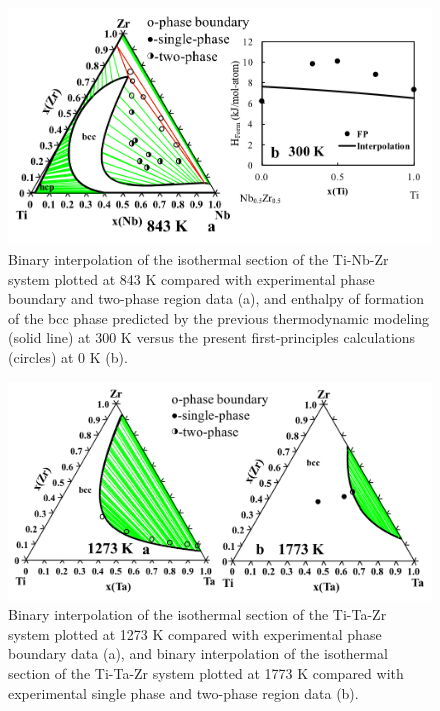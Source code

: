 \newpage
\begin{figure}[H]
	\centering
	\includegraphics[width=\textwidth]{Chapter-3/Figures/TiNbZr.png}
	\caption{Binary interpolation of the isothermal section of the Ti-Nb-Zr system plotted at 843 K compared with experimental phase boundary and two-phase region data \cite{Tokunaga2007} (a), and enthalpy of formation of the bcc phase predicted by the previous thermodynamic modeling (solid line) at 300 K versus the present first-principles calculations (circles) at 0 K (b).}
	\label{Ch3-figure:TiNbZr}
\end{figure}

\newpage
\begin{figure}[H]
	\centering
	\includegraphics[width=\textwidth]{Chapter-3/Figures/TiTaZr1.png}
	\caption{Binary interpolation of the isothermal section of the Ti-Ta-Zr system plotted at 1273 K compared with experimental phase boundary data \cite{Lin1996,Hoch1964} (a), and binary interpolation of the isothermal section of the Ti-Ta-Zr system plotted at 1773 K compared with experimental single phase and two-phase region data \cite{Lin1996,Hoch1964} (b).}
	\label{Ch3-figure:TiTaZr1}
\end{figure}

